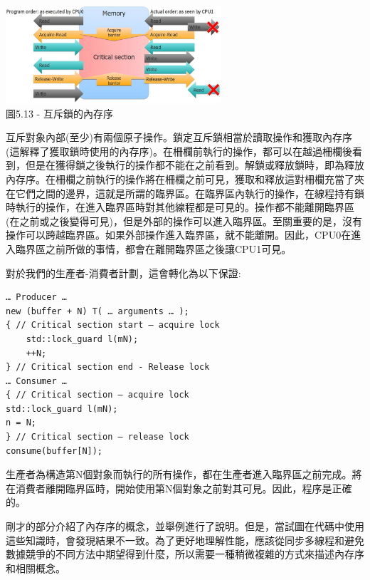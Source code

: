 \begin{center}
\includegraphics[width=0.6\textwidth]{content/1/chapter5/images/13.jpg}\\
圖5.13 - 互斥鎖的內存序
\end{center}

互斥對象內部(至少)有兩個原子操作。鎖定互斥鎖相當於讀取操作和獲取內存序(這解釋了獲取鎖時使用的內存序)。在柵欄前執行的操作，都可以在越過柵欄後看到，但是在獲得鎖之後執行的操作都不能在之前看到。解鎖或釋放鎖時，即為釋放內存序。在柵欄之前執行的操作將在柵欄之前可見，獲取和釋放這對柵欄充當了夾在它們之間的邊界，這就是所謂的臨界區。在臨界區內執行的操作，在線程持有鎖時執行的操作，在進入臨界區時對其他線程都是可見的。操作都不能離開臨界區(在之前或之後變得可見)，但是外部的操作可以進入臨界區。至關重要的是，沒有操作可以跨越臨界區。如果外部操作進入臨界區，就不能離開。因此，CPU0在進入臨界區之前所做的事情，都會在離開臨界區之後讓CPU1可見。

對於我們的生產者-消費者計劃，這會轉化為以下保證:

\begin{lstlisting}[style=styleCXX]
… Producer …
new (buffer + N) T( … arguments … );
{ // Critical section start – acquire lock
	std::lock_guard l(mN);
	++N;
} // Critical section end - Release lock
… Consumer …
{ // Critical section – acquire lock
std::lock_guard l(mN);
n = N;
} // Critical section – release lock
consume(buffer[N]);
\end{lstlisting}

生產者為構造第N個對象而執行的所有操作，都在生產者進入臨界區之前完成。將在消費者離開臨界區時，開始使用第N個對象之前對其可見。因此，程序是正確的。

剛才的部分介紹了內存序的概念，並舉例進行了說明。但是，當試圖在代碼中使用這些知識時，會發現結果不一致。為了更好地理解性能，應該從同步多線程和避免數據競爭的不同方法中期望得到什麼，所以需要一種稍微複雜的方式來描述內存序和相關概念。




































